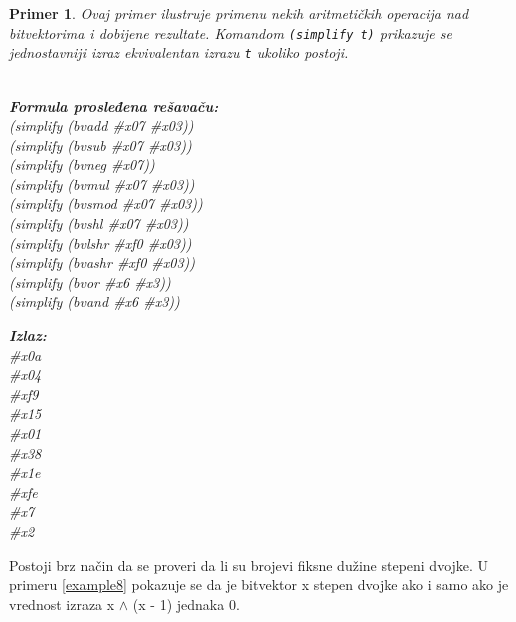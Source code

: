 \documentclass[12pt,oneside]{memoir}
\newtheorem{primer}{Primer}
\begin{document}
\begin{primer} \label{example7} 
Ovaj primer ilustruje primenu nekih aritmetičkih operacija nad bitvektorima i dobijene rezultate. Komandom \texttt{(simplify t)} prikazuje se jednostavniji izraz ekvivalentan izrazu \texttt{t} ukoliko postoji.
\\ \\
\begin{minipage}[b]{0.5\textwidth}
\textbf{Formula prosleđena rešavaču:}
\\(simplify (bvadd \#x07 \#x03)) 
\\(simplify (bvsub \#x07 \#x03)) 
\\(simplify (bvneg \#x07))       
\\(simplify (bvmul \#x07 \#x03)) 
\\(simplify (bvsmod \#x07 \#x03)) 
\\(simplify (bvshl \#x07 \#x03)) 
\\(simplify (bvlshr \#xf0 \#x03))  
\\(simplify (bvashr \#xf0 \#x03))  
\\(simplify (bvor \#x6 \#x3)) 
\\(simplify (bvand \#x6 \#x3))   
\end{minipage}
\hspace{2.5cm}
\begin{minipage}[b]{0.5\textwidth}
\textbf{Izlaz:}
\\\#x0a 
\\\#x04 
\\\#xf9 
\\\#x15 
\\\#x01 
\\\#x38 
\\\#x1e 
\\\#xfe
\\\#x7 
\\\#x2 
\end{minipage}

\end{primer} \par
Postoji brz način da se proveri da li su brojevi fiksne dužine stepeni dvojke. U primeru \ref{example8} pokazuje se da je bitvektor x stepen dvojke ako i samo ako je vrednost izraza x $\land$ (x - 1) jednaka 0.
\end{document}
